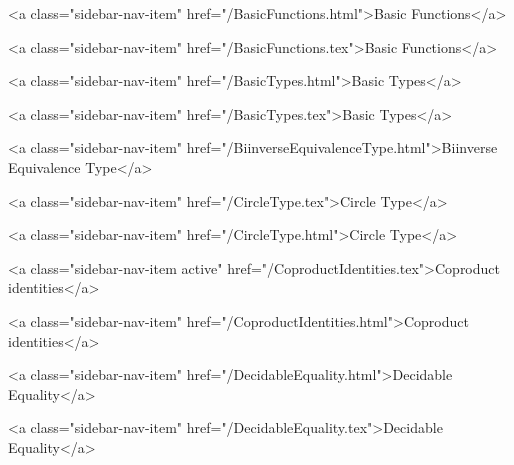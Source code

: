       
    
      
        
          <a class="sidebar-nav-item" href="/BasicFunctions.html">Basic Functions</a>
        
      
    
      
        
          <a class="sidebar-nav-item" href="/BasicFunctions.tex">Basic Functions</a>
        
      
    
      
        
          <a class="sidebar-nav-item" href="/BasicTypes.html">Basic Types</a>
        
      
    
      
        
          <a class="sidebar-nav-item" href="/BasicTypes.tex">Basic Types</a>
        
      
    
      
        
          <a class="sidebar-nav-item" href="/BiinverseEquivalenceType.html">Biinverse Equivalence Type</a>
        
      
    
      
        
          <a class="sidebar-nav-item" href="/CircleType.tex">Circle Type</a>
        
      
    
      
        
          <a class="sidebar-nav-item" href="/CircleType.html">Circle Type</a>
        
      
    
      
        
          <a class="sidebar-nav-item active" href="/CoproductIdentities.tex">Coproduct identities</a>
        
      
    
      
        
          <a class="sidebar-nav-item" href="/CoproductIdentities.html">Coproduct identities</a>
        
      
    
      
        
          <a class="sidebar-nav-item" href="/DecidableEquality.html">Decidable Equality</a>
        
      
    
      
        
          <a class="sidebar-nav-item" href="/DecidableEquality.tex">Decidable Equality</a>
        
